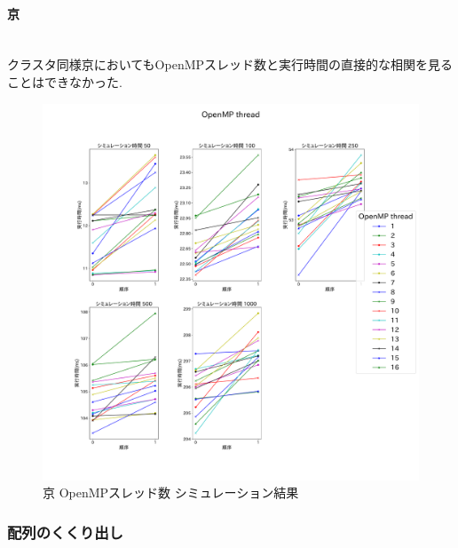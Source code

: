 \paragraph{京}~\\
クラスタ同様京においてもOpenMPスレッド数と実行時間の直接的な相関を見ることはできなかった.\\
\begin{figure}[htb]
\begin{center}
    \includegraphics[width=14cm]{./images/k-OpenMP-thread.pdf}
    \caption{京 OpenMPスレッド数 シミュレーション結果}
    \label{fig:k-openmp}
\end{center}
\end{figure}
\clearpage
\subsubsection{配列のくくり出し}
